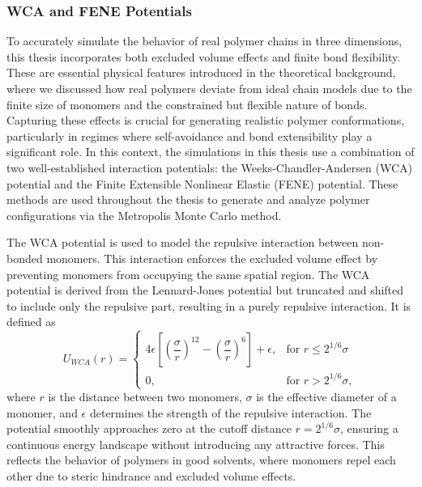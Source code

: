 \documentclass{article}      %
\begin{document}
\subsubsection{WCA and FENE Potentials}
To accurately simulate the behavior of real polymer chains in three dimensions, this thesis incorporates both excluded volume effects and finite bond flexibility. These are essential physical features introduced in the theoretical background, where we discussed how real polymers deviate from ideal chain models due to the finite size of monomers and the constrained but flexible nature of bonds. Capturing these effects is crucial for generating realistic polymer conformations, particularly in regimes where self-avoidance and bond extensibility play a significant role. In this context, the simulations in this thesis use a combination of two well-established interaction potentials: the Weeks-Chandler-Andersen (WCA) potential and the Finite Extensible Nonlinear Elastic (FENE) potential. These methods are used throughout the thesis to generate and analyze polymer configurations via the Metropolis Monte Carlo method.

The WCA potential is used to model the repulsive interaction between non-bonded monomers. This interaction enforces the excluded volume effect by preventing monomers from occupying the same spatial region. The WCA potential is derived from the Lennard-Jones potential but truncated and shifted to include only the repulsive part, resulting in a purely repulsive interaction. It is defined as
\begin{equation}
U_{WCA}(r) = 
\begin{cases}
4\epsilon \left[ \left( \dfrac{\sigma}{r} \right)^{12} - \left( \dfrac{\sigma}{r} \right)^6 \right] + \epsilon, & \text{for } r \leq 2^{1/6}\sigma \\
0, & \text{for } r > 2^{1/6}\sigma,
\end{cases}
\end{equation}
where \( r \) is the distance between two monomers, \( \sigma \) is the effective diameter of a monomer, and \( \epsilon \) determines the strength of the repulsive interaction. The potential smoothly approaches zero at the cutoff distance \( r = 2^{1/6}\sigma \), ensuring a continuous energy landscape without introducing any attractive forces. This reflects the behavior of polymers in good solvents, where monomers repel each other due to steric hindrance and excluded volume effects.
\end{document}
